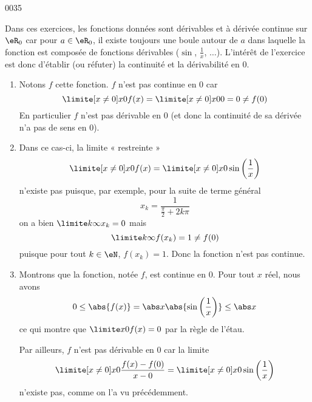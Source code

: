 
\begin{corrige}{0035}


Dans ces exercices, les fonctions données sont dérivables et à dérivée
continue sur $\eR_0$ car pour $a \in \eR_0$, il existe toujours une
boule autour de $a$ dans laquelle la fonction est composée de
fonctions dérivables ($\sin$, $\frac 1x$, $\ldots$). L'intérêt de
l'exercice est donc d'établir (ou réfuter) la continuité et la
dérivabilité en $0$.

\begin{enumerate}

\item 
 Notons $f$ cette fonction. $f$ n'est pas continue en $0$ car
\begin{equation*}
  \limite[x \neq 0] x 0 f(x) = \limite[x \neq 0] x 0 0 = 0 \neq f(0)
\end{equation*}
En particulier $f$ n'est pas dérivable en $0$ (et donc la continuité
de sa dérivée n'a pas de sens en $0$).

\item
Dans ce cas-ci, la limite « restreinte »
\begin{equation*}
  \limite[x \neq 0] x 0 f(x) = \limite[x \neq 0] x 0 \sin\left(\frac 1 x\right)
\end{equation*}
n'existe pas puisque, par exemple, pour la suite de terme général
\begin{equation*}
  x_k = \frac 1 {\frac \pi 2 + 2k \pi}
\end{equation*}
on a bien $\limite k \infty x_k = 0$ mais
\begin{equation*}
  \limite k \infty f(x_k) = 1 \neq f(0)
\end{equation*}
puisque pour tout $k \in \eN$, $f(x_k) = 1$. Donc la fonction n'est pas continue.

\item
Montrons que la fonction, notée $f$, est continue en $0$. Pour tout $x$ réel, nous avons
\begin{equation*}
  0 \leq \abs{f(x)} = \abs x \abs{\sin \left(\frac 1 x\right)} \leq
  \abs x
\end{equation*}
ce qui montre que $\limite x 0 f(x) = 0$ par la règle de l'étau.

Par ailleurs, $f$ n'est pas dérivable en $0$ car la limite
\begin{equation*}
  \limite[x \neq 0] x 0 \frac{f(x) - f(0)}{x-0} = \limite[x\neq 0] x 0 \sin\left(\frac{1}{x}\right)
\end{equation*}
n'existe pas, comme on l'a vu précédemment.


\end{enumerate}
\end{corrige}
